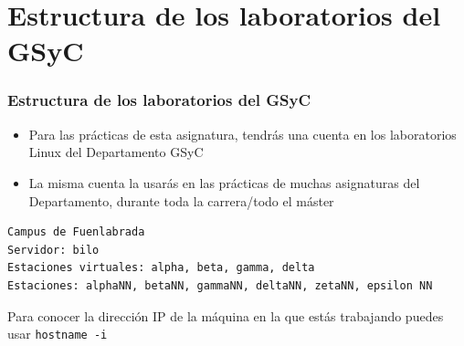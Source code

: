 \documentclass[ucs]{beamer}
\begin{document}
\section{Estructura de los laboratorios del GSyC}
\begin{frame}[fragile]
\frametitle{Estructura de los laboratorios del GSyC}
\begin{itemize}
\item
Para las prácticas de esta asignatura, tendrás una cuenta en los laboratorios Linux del Departamento GSyC
\item
La misma cuenta la usarás en las prácticas de muchas asignaturas del Departamento, durante toda la carrera/todo el máster
\end{itemize}


  \begin{footnotesize}
  \begin{verbatim}
Campus de Fuenlabrada
Servidor: bilo
Estaciones virtuales: alpha, beta, gamma, delta
Estaciones: alphaNN, betaNN, gammaNN, deltaNN, zetaNN, epsilon NN
  \end{verbatim}
  \end{footnotesize}

Para conocer la dirección IP de la máquina en la que estás
trabajando puedes usar \verb|hostname -i|
\end{frame}
\end{document}
